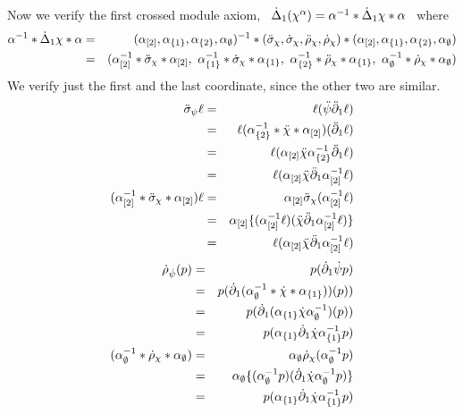 \begin{pf}
Now we verify the first crossed module axiom,~
$\dot{\Delta}_1(\chi^{\alpha}) = \alpha^{-1} * \dot{\Delta}_1 \chi * \alpha$~
where
\begin{eqnarray*}
\alpha^{-1} * \dD_1\chi * \alpha 
  & = & (\alpha_{[2]}, \alpha_{\{1\}}, \alpha_{\{2\}}, 
         \alpha_{\emptyset})^{-1} * (\dds_{\chi}, 
        \ds_{\chi}, \ddr_{\chi}, \dr_{\chi}) 
        * (\alpha_{[2]}, \alpha_{\{1\}}, \alpha_{\{2\}}, \alpha_{\emptyset}) \\
  & = & (\alpha_{[2]}^{-1} * \dds_{\chi} * \alpha_{[2]}, \ 
         \alpha_{\{1\}}^{-1} * \ds_{\chi} * \alpha_{\{1\}}, \ 
         \alpha_{\{2\}}^{-1} * \ddr_{\chi} 
        * \alpha_{\{1\}}, \ \alpha_{\emptyset}^{-1} * \dr_{\chi} 
        * \alpha_{\emptyset})
\end{eqnarray*}
We verify just the first and the last coordinate, since the other two
are similar.
\begin{eqnarray*}
\ddot{\sigma}_{\psi} \ell 
  & = & \ell(\ddot{\psi} \ddot{\partial}_1 \ell) \\
  & = & \ell(\alpha_{\{2\}}^{-1} * \ddot{\chi} * \alpha_{[2]})(\ddot{\partial}_1 \ell) \\
  & = & \ell (\alpha_{[2]}  \ddot{\chi}  \alpha_{\{2\}}^{-1} \ddot{\partial}_1 \ell) \\
  & = & \ell (\alpha_{[2]}  \ddot{\chi} \ddot{\partial}_1  \alpha_{[2]}^{-1} \ell) \\
(\alpha_{[2]}^{-1} *   \ddot{\sigma}_{\chi} *  \alpha_{[2]}) \ell 
  & = &  \alpha_{[2]}  \ddot{\sigma}_{\chi}( \alpha_{[2]}^{-1} \ell) \\
  & = & \alpha_{[2]} \{ (\alpha_{[2]}^{-1} \ell)(\ddot{\chi} \ddot{\partial}_1 \alpha_{[2]}^{-1} 
         \ell) \} \\
  & = & \ell (\alpha_{[2]}  \ddot{\chi} \ddot{\partial}_1  \alpha_{[2]}^{-1} \ell)
\end{eqnarray*}
\begin{eqnarray*}
\dot{\rho}_{\dot{\psi}}(p) 
  & = & p(\dot{\partial}_1 \dot{\psi} p) \\
  & = & p (\dot{\partial}_1(\alpha_{\emptyset}^{-1} * \dot{\chi} * \alpha_{\{1\}}))(p)) \\
  & = & p (\dot{\partial}_1 (\alpha_{\{1\}} \dot{\chi} \alpha_{\emptyset}^{-1})(p)) \\
  & = & p (\alpha_{\{1\}} \dot{\partial}_1 \dot{\chi} \alpha_{\{1\}}^{-1} p) \\
(\alpha_{\emptyset}^{-1} *   \dot{\rho}_{\chi} *  \alpha_{\emptyset}) 
  & = & \alpha_{\emptyset} \dot{\rho}_{\chi}(\alpha_{\emptyset}^{-1} p) \\
  & = & \alpha_{\emptyset} \{ (\alpha_{\emptyset}^{-1} p) 
          (\dot{\partial}_1 \dot{\chi}  \alpha_{\emptyset}^{-1} p) \} \\
  & = & p (\alpha_{\{1\}} \dot{\partial}_1 \dot{\chi} \alpha_{\{1\}}^{-1} p)
\end{eqnarray*}  


\end{pf}
